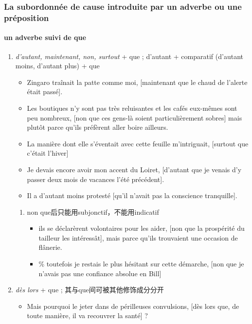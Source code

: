 \documentclass[UTF8]{report}
\begin{document}
\subsubsection{La subordonnée de cause introduite par un adverbe ou une préposition}
\paragraph{un adverbe suivi de que}
\begin{enumerate}
    \item \textit{d’autant, maintenant, non, surtout} + que ; d’autant + comparatif (d’autant moins, d’autant plus) + que
    \begin{itemize}
        \item Zingaro traînait la patte comme moi, [maintenant que le chaud de l’alerte était passé]. 
        \item Les boutiques n’y sont pas très reluisantes et les cafés eux-mêmes sont peu nombreux, [non que ces gens-là soient particulièrement sobres] mais plutôt parce qu’ils préfèrent aller boire ailleurs.
        \item La manière dont elle s’éventait avec cette feuille m’intriguait, [surtout que c’était l’hiver] 
        \item Je devais encore avoir mon accent du Loiret, [d’autant que je venais d’y passer deux mois de vacances l’été précédent].
        \item Il a d’autant moins protesté [qu’il n’avait pas la conscience tranquille].
    \end{itemize}
    \begin{enumerate}
        \item non que后只能用subjonctif，不能用indicatif
        \begin{itemize}
            \item ils se déclarèrent volontaires pour les aider, [non que la prospérité du tailleur les intéressât], mais parce qu’ils trouvaient une occasion de flânerie.
            \item \% toutefois je restais le plus hésitant sur cette démarche, [non que je n’avais pas une confiance absolue en Bill]
        \end{itemize}
    \end{enumerate}
    \item \textit{dès lors} + que ; 其与que间可被其他修饰成分分开
    \begin{itemize}
        \item Mais pourquoi le jeter dans de périlleuses convulsions, [dès lors que, de toute manière, il va recouvrer la santé] ?

\end{itemize}
\end{enumerate}
\end{document}
